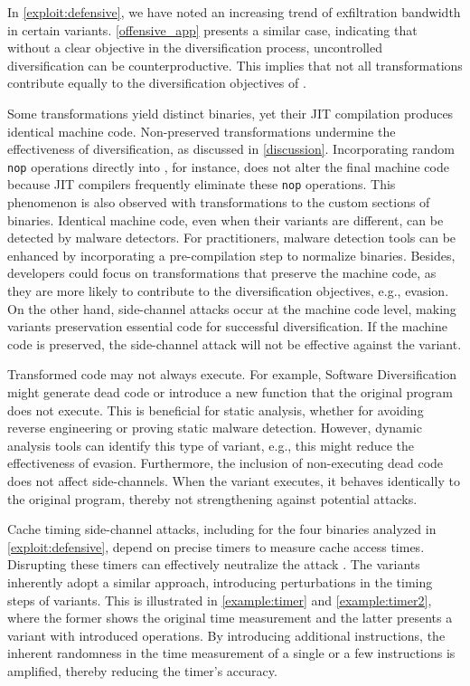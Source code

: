 \label{exploit:discussion}
In \autoref{exploit:defensive}, we have noted an increasing trend of exfiltration bandwidth in certain variants. 
\autoref{offensive_app} presents a similar case, indicating that without a clear objective in the diversification process, uncontrolled diversification can be counterproductive. 
This implies that not all transformations contribute equally to the diversification objectives of \Wasm.


Some transformations yield distinct \Wasm binaries, yet their JIT compilation produces identical machine code.
Non-preserved transformations undermine the effectiveness of diversification, as discussed in \autoref{discussion}.
Incorporating random \texttt{nop} operations directly into \Wasm, for instance, does not alter the final machine code because JIT compilers frequently eliminate these \texttt{nop} operations.
This phenomenon is also observed with transformations to the custom sections of \Wasm binaries.
Identical machine code, even when their \Wasm variants are different, can be detected by malware detectors.
For practitioners, malware detection tools can be enhanced by incorporating a pre-compilation step to normalize \Wasm binaries.
Besides, developers could focus on transformations that preserve the machine code, as they are more likely to contribute to the diversification objectives, e.g., evasion.
On the other hand, side-channel attacks occur at the machine code level, making \Wasm variants preservation essential code for successful diversification.
If the machine code is preserved, the side-channel attack will not be effective against the \Wasm variant.


Transformed code may not always execute. 
For example, Software Diversification might generate dead code or introduce a new function that the original program does not execute. 
This is beneficial for static analysis, whether for avoiding reverse engineering or proving static malware detection. 
However, dynamic analysis tools can identify this type of variant, e.g., this might reduce the effectiveness of evasion. 
Furthermore, the inclusion of non-executing dead code does not affect side-channels.
When the variant executes, it behaves identically to the original program, thereby not strengthening against potential attacks.
 
 Cache timing side-channel attacks, including for the four binaries analyzed in \autoref{exploit:defensive}, depend on precise timers to measure cache access times. 
Disrupting these timers can effectively neutralize the attack \cite{JStimers}. 
The \Wasm variants inherently adopt a similar approach, introducing perturbations in the timing steps of \Wasm variants. 
This is illustrated in \autoref{example:timer} and \autoref{example:timer2}, where the former shows the original time measurement and the latter presents a variant with introduced operations.
By introducing additional instructions, the inherent randomness in the time measurement of a single or a few instructions is amplified, thereby reducing the timer's accuracy. 

